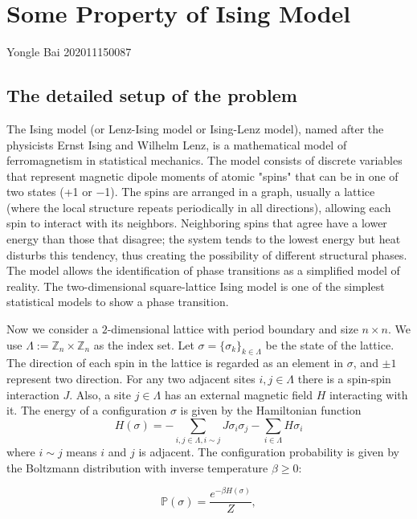 \documentclass[11pt,openany]{book}              %
\begin{document}
\chapter*{Some Property of Ising Model}
\vspace{-1cm}
{\fontsize{18.0pt}{\baselineskip}\selectfont  Yongle Bai 202011150087}

\section{The detailed setup of the problem}
The Ising model (or Lenz-Ising model or Ising-Lenz model), named after the physicists Ernst Ising and Wilhelm Lenz, is a mathematical model of ferromagnetism in statistical mechanics.
The model consists of discrete variables that represent magnetic dipole moments of atomic "spins" that can be in one of two states (+1 or −1).
The spins are arranged in a graph, usually a lattice (where the local structure repeats periodically in all directions), allowing each spin to interact with its neighbors.
Neighboring spins that agree have a lower energy than those that disagree; the system tends to the lowest energy but heat disturbs this tendency, thus creating the possibility of different structural phases.
The model allows the identification of phase transitions as a simplified model of reality.
The two-dimensional square-lattice Ising model is one of the simplest statistical models to show a phase transition.

Now we consider a \(2\)-dimensional lattice with period boundary and size \(n \times n\).
We use \(\Lambda:=\mathbb{Z}_n \times \mathbb{Z}_n\) as the index set.
Let \(\sigma=\{ \sigma_k\}_{k \in \Lambda}\) be the state of the lattice.
The direction of each spin in the lattice is regarded as an element in \(\sigma\), and \(\pm 1\) represent two direction.
For any two adjacent sites \(i,j\in \Lambda \) there is a spin-spin interaction \(J\).
Also, a site \(j\in \Lambda \) has an external magnetic field \(H\) interacting with it. The energy of a configuration \(\sigma\) is given by the Hamiltonian function
\begin{equation}\label{equ:1}
	H(\sigma)=-\sum_{i,j\in\Lambda,i \sim j} J \sigma_i \sigma_j-\sum_{i \in \Lambda}H \sigma_i
\end{equation}
where \(i \sim j\) means \(i\) and \(j\) is adjacent.
The configuration probability is given by the Boltzmann distribution with inverse temperature \( \beta \geq 0\):

\[ \mathbb{P}(\sigma )={\frac {e^{-\beta H(\sigma )}}{Z}},\]
\end{document}
